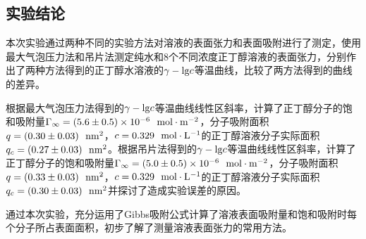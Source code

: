 \documentclass[12pt]{article}
\begin{document}
 	 \subsection{实验结论}
本次实验通过两种不同的实验方法对溶液的表面张力和表面吸附进行了测定，使用最大气泡压力法和吊片法测定纯水和8个不同浓度正丁醇溶液的表面张力，分别作出了两种方法得到的正丁醇水溶液的$\gamma-{\rm lg}c$等温曲线，比较了两方法得到的曲线的差异。\par 
根据最大气泡压力法得到的$\gamma-{\rm lg}c$等温曲线线性区斜率，计算了正丁醇分子的饱和吸附量$\Gamma_{\infty}=(5.6\pm 0.5)\times10^{-6}\ \ {\rm mol\cdot m^{-2}}$，分子吸附面积$q=(0.30\pm 0.03)\ \ {\rm nm^{2}}$，$c=0.329\ \ {\rm mol\cdot L^{-1}}$的正丁醇溶液分子实际面积$q_{c}=(0.27\pm 0.03)\ \ {\rm nm^{2}}$。根据吊片法得到的$\gamma-{\rm lg}c$等温曲线线性区斜率，计算了正丁醇分子的饱和吸附量$\Gamma_{\infty}=(5.0\pm 0.5)\times10^{-6}\ \ {\rm mol\cdot m^{-2}}$，分子吸附面积$q=(0.33\pm 0.03)\ \ {\rm nm^{2}}$，$c=0.329\ \ {\rm mol\cdot L^{-1}}$的正丁醇溶液分子实际面积$q_{c}=(0.30\pm 0.03)\ \ {\rm nm^{2}}$并探讨了造成实验误差的原因。\par 
通过本次实验，充分运用了Gibbs吸附公式计算了溶液表面吸附量和饱和吸附时每个分子所占表面面积，初步了解了测量溶液表面张力的常用方法。

 

   
\vbox{}
\vbox{}



\end{document}
